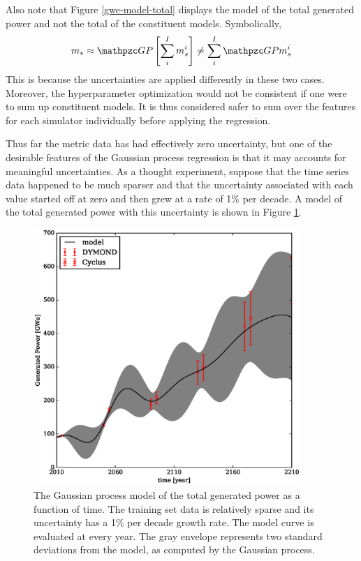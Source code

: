 \clearpage

Also note that Figure \ref{gwe-model-total} displays the model of the total 
generated power and not the total of the constituent models. Symbolically, 
\begin{equation}
\label{total-model}
m_* \approx \GP \left[\sum_i^I m_s^i\right] \ne \sum_i^I \GP m_s^i
\end{equation}
This is because the uncertainties are applied differently in these two cases. 
Moreover, the hyperparameter
optimization would not be consistent if one were to sum up constituent 
models. It is thus considered safer
to sum over the features for each simulator individually before applying the 
regression.

Thus far the metric data has had effectively zero uncertainty, but one of the 
desirable features of the Gaussian process regression is that it may accounts 
for meaningful uncertainties. As a thought experiment, suppose that the time 
series data happened to be much sparser and that 
the uncertainty associated with each value started off at zero and then grew at 
a rate of 1\% per decade. A model of the total generated power with this uncertainty 
is shown in Figure \ref{gwe-model-total-with-uncertainty}.

\begin{figure}[htb]
\centering
\includegraphics[width=0.9\textwidth]{gwe-model-total-with-uncertainty.eps}
\caption{The Gaussian process model of the total generated power
as a function of time. The training set data is relatively sparse and its uncertainty
has a 1\% per decade growth rate. The model curve is evaluated at every year. The 
gray envelope represents two standard deviations from the model, as computed by 
the Gaussian process.}
\label{gwe-model-total-with-uncertainty}
\end{figure}

